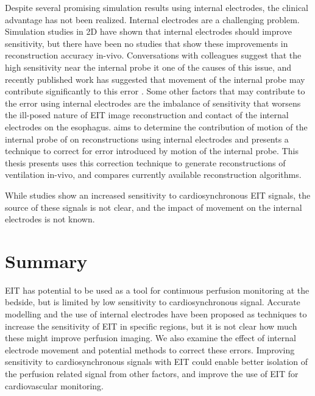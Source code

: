 Despite several promising simulation results using internal electrodes, the clinical advantage
has not been realized. 
Internal electrodes are a challenging problem. Simulation studies 
in 2D have shown that internal electrodes should improve sensitivity, 
but there have been no studies that show these improvements in reconstruction 
accuracy in-vivo. Conversations with colleagues suggest that the high 
sensitivity near the internal probe it one of the causes of this issue, 
and recently published work has suggested that movement of the internal 
probe may contribute significantly to this 
error \parencite{nguyen_electrical_2020}. 
Some other factors that may contribute to the error using 
internal electrodes are the imbalance of sensitivity that 
worsens the ill-posed nature of EIT image reconstruction and 
contact of the internal electrodes on the esophagus. 
 aims to determine the contribution of motion of the 
internal probe of on reconstructions using internal electrodes and 
presents a technique to correct for error introduced by motion of the 
internal probe. This thesis presents uses this correction technique to 
generate reconstructions of ventilation in-vivo, and compares currently 
available reconstruction algorithms. 

While studies show an increased sensitivity to cardiosynchronous
EIT signals, the source of these signals is not clear, and the impact of movement 
on the internal electrodes is not known. 

\section{Summary}
EIT has potential to be used as a tool for continuous perfusion monitoring at the bedside,
but is limited by low sensitivity to cardiosynchronous signal. 
Accurate modelling and 
the use of internal electrodes have been proposed as techniques to 
increase the sensitivity of EIT in specific regions, 
but it is not clear how much these might improve perfusion imaging. 
We also examine the effect of internal electrode movement and potential
methods to correct these errors. 
Improving sensitivity to cardiosynchronous signals with EIT could enable 
better isolation of the perfusion related signal from other factors, and 
improve the use of EIT for cardiovascular monitoring. 


